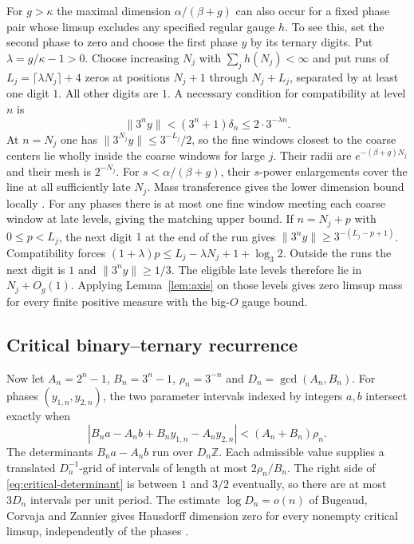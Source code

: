 \documentclass[11pt,a4paper,reqno]{amsart}
\theoremstyle{definition}
\theoremstyle{remark}
\numberwithin{equation}{section}
\begin{document}
For $g>\kappa$ the maximal dimension $\alpha/(\beta+g)$ can also
occur for a fixed phase pair whose limsup excludes any specified
regular gauge $h$. To see this, set the second phase to zero and
choose the first phase $y$ by its ternary digits. Put
$\lambda=g/\kappa-1>0$. Choose increasing $N_j$ with
$\sum_j h(N_j)<\infty$ and put runs of $L_j=\lceil\lambda N_j\rceil+4$
zeros at positions $N_j+1$ through $N_j+L_j$, separated by at least
one digit $1$. All other digits are $1$. A necessary condition for
compatibility at level $n$ is
\[
 \|3^ny\|<(3^n+1)\delta_n\le 2\cdot 3^{-\lambda n}.
\]
At $n=N_j$ one has $\|3^{N_j}y\|\le 3^{-L_j}/2$, so the fine
windows closest to the coarse centers lie wholly inside the coarse
windows for large $j$. Their radii are $e^{-(\beta+g)N_j}$ and their
mesh is $2^{-N_j}$. For $s<\alpha/(\beta+g)$, their $s$-power
enlargements cover the line at all sufficiently late $N_j$.
Mass transference gives the lower dimension bound locally
\cite[Theorem~2]{MTP}. For any phases there is at most one fine
window meeting each coarse window at late levels, giving the
matching upper bound. If $n=N_j+p$ with $0\le p<L_j$, the next digit
$1$ at the end of the run gives $\|3^ny\|\ge 3^{-(L_j-p+1)}$.
Compatibility forces $(1+\lambda)p\le L_j-\lambda N_j+1+\log_3 2$.
Outside the runs the next digit is $1$ and $\|3^ny\|\ge 1/3$.
The eligible late levels therefore lie in $N_j+O_g(1)$. Applying
Lemma~\ref{lem:axis} on those levels gives zero limsup mass for
every finite positive measure with the big-$O$ gauge bound.

\subsection{Critical binary--ternary recurrence}

Now let $A_n=2^n-1$, $B_n=3^n-1$, $\rho_n=3^{-n}$ and
$D_n=\gcd(A_n,B_n)$. For phases $(y_{1,n},y_{2,n})$, the two
parameter intervals indexed by integers $a,b$ intersect exactly
when
\begin{equation}\label{eq:critical-determinant}
 |B_na-A_nb+B_ny_{1,n}-A_ny_{2,n}|<(A_n+B_n)\rho_n.
\end{equation}
The determinants $B_na-A_nb$ run over $D_n\mathbb Z$. Each admissible
value supplies a translated $D_n^{-1}$-grid of intervals of length at
most $2\rho_n/B_n$. The right side of
\eqref{eq:critical-determinant} is between $1$ and $3/2$ eventually,
so there are at most $3D_n$ intervals per unit period. The estimate
$\log D_n=o(n)$ of Bugeaud, Corvaja and Zannier gives Hausdorff
dimension zero for every nonempty critical limsup, independently of
the phases \cite{BCZ}.
\end{document}
